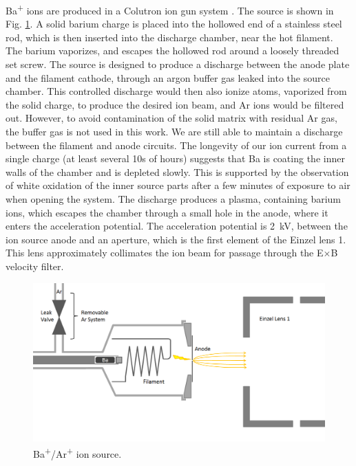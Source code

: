 Ba\textsuperscript{+} ions are produced in a Colutron ion gun system \cite{Colutron}.  The source is shown in Fig. \ref{fig:ionsource}.  A solid barium charge is placed into the hollowed end of a stainless steel rod, which is then inserted into the discharge chamber, near the hot filament.  The barium vaporizes, and escapes the hollowed rod around a loosely threaded set screw.  The source is designed to produce a discharge between the anode plate and the filament cathode, through an argon buffer gas leaked into the source chamber.  This controlled discharge would then also ionize atoms, vaporized  from the solid charge, to produce the desired ion beam, and Ar ions would be filtered out.  However, to avoid contamination of the solid matrix with residual Ar gas, the buffer gas is not used in this work.  We are still able to maintain a discharge between the filament and anode circuits.  The longevity of our ion current from a single charge (at least several 10s of hours) suggests that Ba is coating the inner walls of the chamber and is depleted slowly.  This is supported by the observation of white oxidation of the inner source parts after a few minutes of exposure to air when opening the system.  The discharge produces a plasma, containing barium ions, which escapes the chamber through a small hole in the anode, where it enters the acceleration potential.  The acceleration potential is 2~kV, between the ion source anode and an aperture, which is the first element of the Einzel lens 1.  This lens approximately collimates the ion beam for passage through the E$\times$B velocity filter.

\begin{figure} %
        \centering
                \includegraphics[width=.95\textwidth]{figures/ionSource.png}
                \caption{Ba\textsuperscript{+}/Ar\textsuperscript{+} ion source.}
\label{fig:ionsource}
\end{figure}

